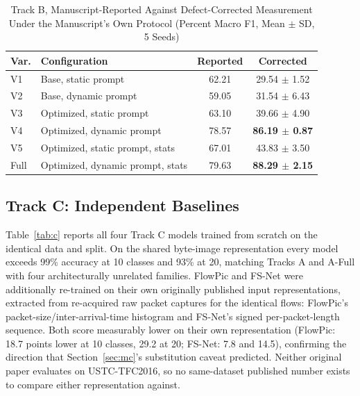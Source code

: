 \documentclass[journal]{IEEEtran}
\begin{document}
\begin{table}[t]
\caption{Track B, Manuscript-Reported Against Defect-Corrected Measurement Under the Manuscript's Own Protocol (Percent Macro F1, Mean $\pm$ SD, 5 Seeds)}
\label{tab:b}
\centering
\renewcommand{\arraystretch}{1.2}
\begin{tabular}{|l|p{2.1cm}|c|c|}
\hline
\textbf{Var.} & \textbf{Configuration} & \textbf{Reported} & \textbf{Corrected} \\
\hline
V1 & Base, static prompt & 62.21 & 29.54 $\pm$ 1.52 \\
\hline
V2 & Base, dynamic prompt & 59.05 & 31.54 $\pm$ 6.43 \\
\hline
V3 & Optimized, static prompt & 63.10 & 39.66 $\pm$ 4.90 \\
\hline
V4 & Optimized, dynamic prompt & 78.57 & \textbf{86.19 $\pm$ 0.87} \\
\hline
V5 & Optimized, static prompt, stats & 67.01 & 43.83 $\pm$ 3.50 \\
\hline
Full & Optimized, dynamic prompt, stats & 79.63 & \textbf{88.29 $\pm$ 2.15} \\
\hline
\end{tabular}
\end{table}

\subsection{Track C: Independent Baselines}\label{sec:rcorig}
Table~\ref{tab:c} reports all four Track C models trained from scratch on the identical data and split. On the shared byte-image representation every model exceeds 99\% accuracy at 10 classes and 93\% at 20, matching Tracks A and A-Full with four architecturally unrelated families. FlowPic and FS-Net were additionally re-trained on their own originally published input representations, extracted from re-acquired raw packet captures for the identical flows: FlowPic's packet-size/inter-arrival-time histogram and FS-Net's signed per-packet-length sequence. Both score measurably lower on their own representation (FlowPic: 18.7 points lower at 10 classes, 29.2 at 20; FS-Net: 7.8 and 14.5), confirming the direction that Section~\ref{sec:mc}'s substitution caveat predicted. Neither original paper evaluates on USTC-TFC2016, so no same-dataset published number exists to compare either representation against.
\end{document}
